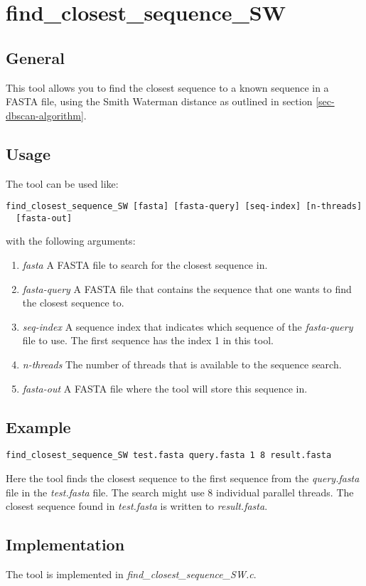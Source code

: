 \section{find\_closest\_sequence\_SW}

\subsection{General}

This tool allows you to find the closest sequence to a known sequence in a
FASTA file, using the Smith Waterman distance as outlined in section
\ref{sec-dbscan-algorithm}.

\subsection{Usage}

The tool can be used like:
\begin{lstlisting}
find_closest_sequence_SW [fasta] [fasta-query] [seq-index] [n-threads]
  [fasta-out]
\end{lstlisting}
with the following arguments:
\begin{enumerate}
  \item \emph{fasta} A FASTA file to search for the closest sequence
    in.
  \item \emph{fasta-query} A FASTA file that contains the sequence
    that one wants to find the closest sequence to.
  \item \emph{seq-index} A sequence index that indicates which
    sequence of the \emph{fasta-query} file to use. The first sequence
    has the index 1 in this tool. 
  \item \emph{n-threads} The number of threads that is available to
    the sequence search.
  \item \emph{fasta-out} A FASTA file where the tool will store this
    sequence in. 
\end{enumerate}

\subsection{Example}

\begin{lstlisting}
find_closest_sequence_SW test.fasta query.fasta 1 8 result.fasta
\end{lstlisting}
Here the tool finds the closest sequence to the first sequence from
the \emph{query.fasta} file in the \emph{test.fasta} file. The search
might use 8 individual parallel threads. The closest sequence found in
\emph{test.fasta} is written to \emph{result.fasta}.

\subsection{Implementation}
The tool is implemented in \emph{find\_closest\_sequence\_SW.c}.

